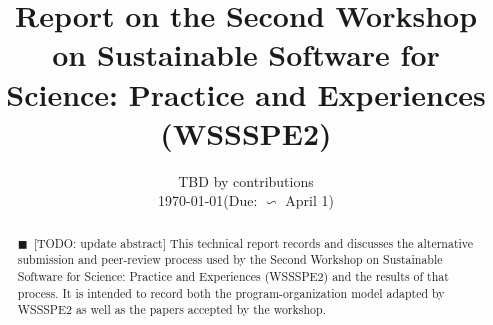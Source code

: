 \documentclass[11pt, oneside]{amsart}
\newcommand{\todo}[1]{{\color{blue}$\blacksquare$~\textsf{[TODO: #1]}}}
\begin{document}
\title[]{Report on the Second Workshop on Sustainable Software for Science: Practice and Experiences (WSSSPE2)} 

\author{TBD by contributions \\{\scriptsize\today \quad  (Due:  $\backsim$ April 1)}}
%
%
%
%  
%
%
%
%
%
%
%


       
\begin{abstract}      
\todo{update abstract}
This technical report records and discusses the alternative submission and
peer-review process used by the Second Workshop on Sustainable Software for
Science: Practice and Experiences (WSSSPE2) and the results of that process. It
is intended to record both the program-organization model adapted by WSSSPE2 as
well as the papers accepted by the workshop.
\end{abstract}


\maketitle
\end{document}
